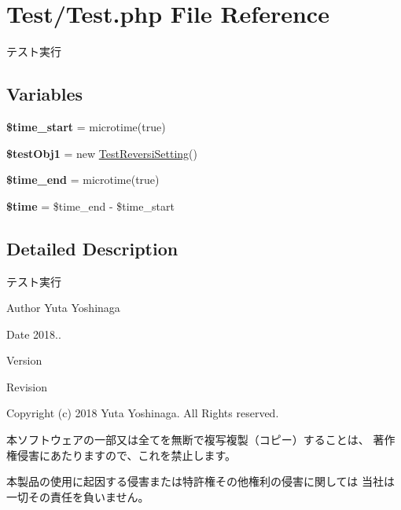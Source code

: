 \hypertarget{_test_8php}{}\section{Test/\+Test.php File Reference}
\label{_test_8php}


テスト実行  


\subsection*{Variables}
\begin{DoxyCompactItemize}
\item 
\mbox{\label{_test_8php_a44d4a5ef593dd745482e1f2adb2f7774}} 
{\bfseries \$time\+\_\+start} = microtime(true)
\item 
\mbox{\label{_test_8php_aa0e0c4380b3ca4652ca454f0eacc8e52}} 
{\bfseries \$test\+Obj1} = new \hyperlink{class_test_reversi_setting}{Test\+Reversi\+Setting}()
\item 
\mbox{\label{_test_8php_a77f9b5c7480ad8fa3231d311d4b6feb3}} 
{\bfseries \$time\+\_\+end} = microtime(true)
\item 
\mbox{\label{_test_8php_a78db1a0602e3b6ac1d9a1b5ec103c160}} 
{\bfseries \$time} = \$time\+\_\+end -\/ \$time\+\_\+start
\end{DoxyCompactItemize}


\subsection{Detailed Description}
テスト実行 

\begin{DoxyAuthor}{Author}
Yuta Yoshinaga 
\end{DoxyAuthor}
\begin{DoxyDate}{Date}
2018.. 
\end{DoxyDate}
\begin{DoxyParagraph}{Version}

\end{DoxyParagraph}
\begin{DoxyParagraph}{Revision}

\end{DoxyParagraph}


Copyright (c) 2018 Yuta Yoshinaga. All Rights reserved.


\begin{DoxyItemize}
\item 本ソフトウェアの一部又は全てを無断で複写複製（コピー）することは、 著作権侵害にあたりますので、これを禁止します。
\item 本製品の使用に起因する侵害または特許権その他権利の侵害に関しては 当社は一切その責任を負いません。 
\end{DoxyItemize}
